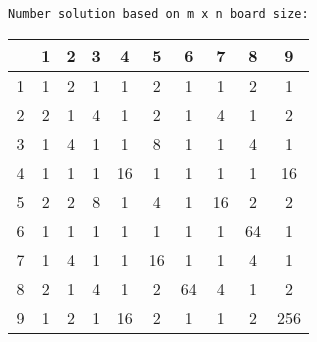 \begin{english}
    \begin{Verbatim}[commandchars=\\\{\}]
Number solution based on m x n board size:
    \end{Verbatim}
    \begin{tabular}{ |c||c|c|c|c|c|c|c|c|c| }
        \hline
        \ & 1 & 2 & 3 & 4 & 5 & 6 & 7 & 8 & 9 \\
        \hline
        \hline
        1 & 1 & 2 & 1 & 1 & 2 & 1 & 1 & 2 & 1 \\
        \hline
        2 & 2 & 1 & 4 & 1 & 2 & 1 & 4 & 1 & 2 \\
        \hline
        3 & 1 & 4 & 1 & 1 & 8 & 1 & 1 & 4 & 1 \\
        \hline
        4 & 1 & 1 & 1 & 16 & 1 & 1 & 1 & 1 & 16 \\
        \hline
        5 & 2 & 2 & 8 & 1 & 4 & 1 & 16 & 2 & 2 \\
        \hline
        6 & 1 & 1 & 1 & 1 & 1 & 1 & 1 & 64 & 1 \\
        \hline
        7 & 1 & 4 & 1 & 1 & 16 & 1 & 1 & 4 & 1 \\
        \hline
        8 & 2 & 1 & 4 & 1 & 2 & 64 & 4 & 1 & 2 \\
        \hline
        9 & 1 & 2 & 1 & 16 & 2 & 1 & 1 & 2 & 256 \\
        \hline
      \end{tabular}
\end{english}



